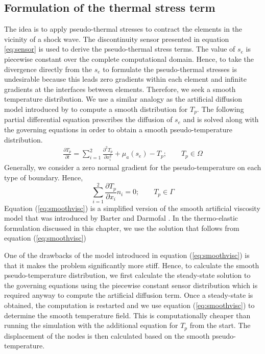 \documentclass[review]{elsarticle}
\begin{document}
\subsection{Formulation of the thermal stress term}
The idea is to apply pseudo-thermal stresses to contract the elements in the vicinity of a shock wave. 
The discontinuity sensor presented in equation \ref{eq:sensor} is used to derive the pseudo-thermal stress terms. The value of $s_e$ is piecewise constant over the complete computational domain.
Hence, to take the divergence directly from the $s_e$ to formulate the pseudo-thermal stresses is undesirable because this leads zero gradients within each element and infinite gradients at the interfaces between elements. 
Therefore, we seek a smooth temperature distribution.
We use a similar analogy as the artificial diffusion model introduced by \cite{Barter2009} to compute a smooth distribution for $T_p$.
The following partial differential equation prescribes the diffusion of $s_e$ and is solved along with the governing equations in order to obtain a smooth pseudo-temperature distribution.
\begin{eqnarray}\label{eq:smoothvisc}
\frac{\partial {T_p}}{\partial t} = \sum_{i=1}^2 \frac{\partial^2 T_p}{\partial x_i^2} + \mu_a(s_e) -{T_p}; \qquad {{T_p}}\in \Omega
\end{eqnarray}
Generally, we consider a zero normal gradient for the pseudo-temperature on each type of boundary. Hence,
\begin{equation}
\sum_{i=1}^2\frac{\partial T_p}{\partial x_i}n_i = 0; \qquad {{T_p}}\in \Gamma
\end{equation}
Equation (\ref{eq:smoothvisc}) is a simplified version of the smooth artificial viscosity model that was introduced by Barter and Darmofal \cite{Barter2009}. In the thermo-elastic formulation discussed in this chapter, we use the solution that follows from equation (\ref{eq:smoothvisc}) 
\par One of the drawbacks of the model introduced in equation (\ref{eq:smoothvisc}) is that it makes the problem significantly more stiff. 
Hence, to calculate the smooth pseudo-temperature distribution, we first calculate the steady-state solution to the governing equations using the piecewise constant sensor distribution which is required anyway to compute the artificial diffusion term.
Once a steady-state is obtained, the computation is restarted and we use equation (\ref{eq:smoothvisc}) to determine the smooth temperature field. 
This is computationally cheaper than running the simulation with the additional equation for $T_p$ from the start.
The displacement of the nodes is then calculated based on the smooth pseudo-temperature.
\end{document}
